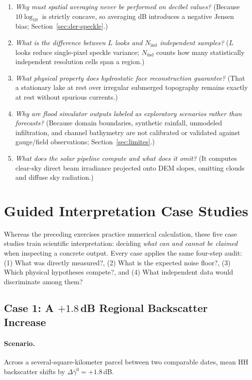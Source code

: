 \documentclass[11pt,a4paper]{article}
\begin{document}
\begin{enumerate}
  \item \emph{Why must spatial averaging never be performed on decibel values?} (Because $10\log_{10}$ is strictly concave, so averaging dB introduces a negative Jensen bias; Section~\ref{sec:der-speckle}.)
  \item \emph{What is the difference between $L$ looks and $N_{\mathrm{ind}}$ independent samples?} ($L$ looks reduce single-pixel speckle variance; $N_{\mathrm{ind}}$ counts how many statistically independent resolution cells span a region.)
  \item \emph{What physical property does hydrostatic face reconstruction guarantee?} (That a stationary lake at rest over irregular submerged topography remains exactly at rest without spurious currents.)
  \item \emph{Why are flood simulator outputs labeled as exploratory scenarios rather than forecasts?} (Because domain boundaries, synthetic rainfall, unmodeled infiltration, and channel bathymetry are not calibrated or validated against gauge/field observations; Section~\ref{sec:limites}.)
  \item \emph{What does the solar pipeline compute and what does it omit?} (It computes clear-sky direct beam irradiance projected onto DEM slopes, omitting clouds and diffuse sky radiation.)
\end{enumerate}


\section{Guided Interpretation Case Studies}
\label{sec:casos}

Whereas the preceding exercises practice numerical calculation, these five case studies train scientific interpretation: deciding \emph{what can and cannot be claimed} when inspecting a concrete output. Every case applies the same four-step audit: (1) What was directly measured?, (2) What is the expected noise floor?, (3) Which physical hypotheses compete?, and (4) What independent data would discriminate among them?

\subsection{Case 1: A $+1.8$\,dB Regional Backscatter Increase}

\paragraph{Scenario.} Across a several-square-kilometer parcel between two comparable dates, mean HH backscatter shifts by $\Delta\bar\gamma^0=+1.8$\,dB.
\end{document}
